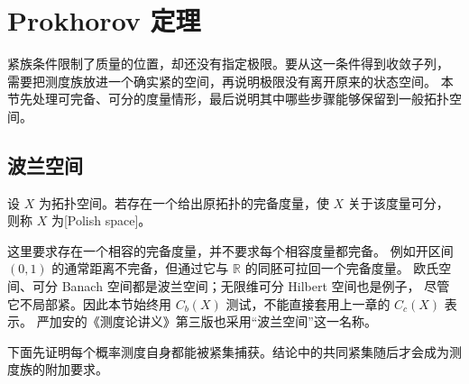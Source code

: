\section{Prokhorov 定理}
\label{b1:sec:1204}


紧族条件限制了质量的位置，却还没有指定极限。要从这一条件得到收敛子列，
需要把测度族放进一个确实紧的空间，再说明极限没有离开原来的状态空间。
本节先处理可完备、可分的度量情形，最后说明其中哪些步骤能够保留到一般拓扑空间。

\subsection{波兰空间}
\label{b1:subsec:120401}

\begin{definition}\label{b1:def:polish-space}
设 \(X\) 为拓扑空间。若存在一个给出原拓扑的完备度量，使 \(X\) 关于该度量可分，
则称 \(X\) 为[Polish space]。
\end{definition}

这里要求存在一个相容的完备度量，并不要求每个相容度量都完备。
例如开区间 \((0,1)\) 的通常距离不完备，但通过它与 \(\mathbb R\) 的同胚可拉回一个完备度量。
欧氏空间、可分 Banach 空间都是波兰空间；无限维可分 Hilbert 空间也是例子，
尽管它不局部紧。因此本节始终用 \(C_b(X)\) 测试，不能直接套用上一章的 \(C_c(X)\) 表示。
严加安的《测度论讲义》第三版\cite[第5.7节]{Yan2021Cedulun}也采用“波兰空间”这一名称。

\ProseParagraphBreak

下面先证明每个概率测度自身都能被紧集捕获。结论中的共同紧集随后才会成为测度族的附加要求。

